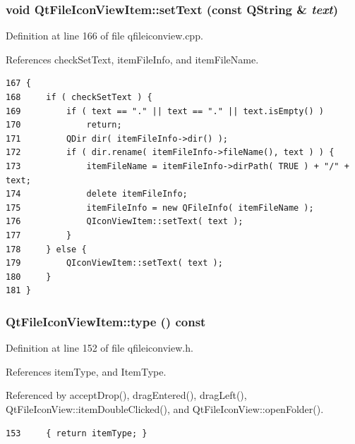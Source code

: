 \subsubsection{\setlength{\rightskip}{0pt plus 5cm}void Qt\-File\-Icon\-View\-Item::set\-Text (const QString \& {\em text})\hspace{0.3cm}{\tt  [virtual]}}\label{classQtFileIconViewItem_QtFileIconViewItema5}




Definition at line 166 of file qfileiconview.cpp.

References check\-Set\-Text, item\-File\-Info, and item\-File\-Name.



\footnotesize\begin{verbatim}167 {
168     if ( checkSetText ) {
169         if ( text == "." || text == "." || text.isEmpty() )
170             return;
171         QDir dir( itemFileInfo->dir() );
172         if ( dir.rename( itemFileInfo->fileName(), text ) ) {
173             itemFileName = itemFileInfo->dirPath( TRUE ) + "/" + text;
174             delete itemFileInfo;
175             itemFileInfo = new QFileInfo( itemFileName );
176             QIconViewItem::setText( text );
177         }
178     } else {
179         QIconViewItem::setText( text );
180     }
181 }
\end{verbatim}\normalsize 
{}
\subsubsection{ Qt\-File\-Icon\-View\-Item::type () const\hspace{0.3cm}{\tt  [inline]}}\label{classQtFileIconViewItem_QtFileIconViewItema2}




Definition at line 152 of file qfileiconview.h.

References item\-Type, and Item\-Type.

Referenced by accept\-Drop(), drag\-Entered(), drag\-Left(), Qt\-File\-Icon\-View::item\-Double\-Clicked(), and Qt\-File\-Icon\-View::open\-Folder().



\footnotesize\begin{verbatim}153     { return itemType; }
\end{verbatim}\normalsize 
{}
